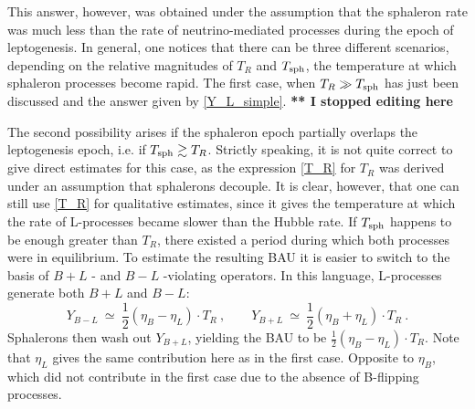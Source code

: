 \documentclass[12pt]{revtex4}
\newcommand{\Tsph}{T_{\rm sph}}
\begin{document}
	This answer, however, was obtained under the assumption that
	the sphaleron rate was much less than the rate of 
	neutrino-mediated processes during the epoch of leptogenesis.
	In general, one notices that  there can be three different scenarios, 
	depending on the relative magnitudes of $ T_R $ and $ \Tsph $, the 
	temperature at which sphaleron processes become rapid.
	The first case, when $ T_R \gg \Tsph $ has just been discussed
	and the answer given by \eqref{Y_L_simple}.
	{\bf *** I stopped editing here}


	The second possibility arises if the sphaleron epoch partially
	overlaps the leptogenesis epoch, i.e. if $ \Tsph \gtrsim T_R $.
	Strictly speaking, it is not quite correct to give direct
	estimates for this case, as the expression \eqref{T_R} for $ T_R $
	was derived under an assumption that sphalerons decouple.
	It is clear, however, that one can still use \eqref{T_R} for
	qualitative estimates, since it gives the temperature at which
	the rate of L-processes became slower than the Hubble rate.
	If $ \Tsph $ happens to be enough greater than $ T_R $, there
	existed a period during which both processes were in equilibrium.
	To estimate the resulting BAU it is easier to switch to the
	basis of $ B + L $ - and $ B - L $ -violating operators.
	In this language, L-processes generate both  $ B + L $ and $ B - L $:
\[
	Y_{B-L} ~\simeq~ \frac 12 (\eta_B - \eta_L ) \cdot T_R~,\qquad
	Y_{B+L} ~\simeq~ \frac 12 (\eta_B + \eta_L ) \cdot T_R~.
\]	
	Sphalerons then wash out $ Y_{B+L} $, yielding the BAU to be
	$ \frac 12 (\eta_B - \eta_L ) \cdot T_R $.
	Note that $ \eta_L $ gives the same contribution here as in the 
	first case.
	Opposite to $ \eta_B $, which did not contribute in the first case
	due to the absence of B-flipping processes.
	
\end{document}
